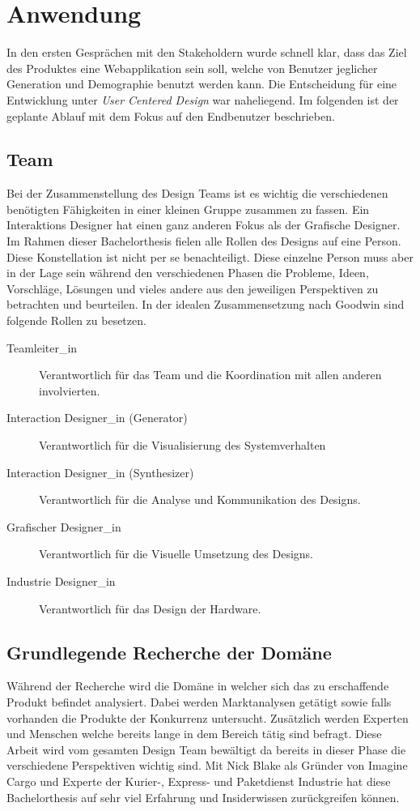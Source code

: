 \section{Anwendung}
In den ersten Gesprächen mit den Stakeholdern wurde schnell klar, dass das Ziel des Produktes eine Webapplikation sein soll, welche von Benutzer jeglicher Generation und Demographie benutzt werden kann. Die Entscheidung für eine Entwicklung unter \textit{User Centered Design} war naheliegend. Im folgenden ist der geplante Ablauf mit dem Fokus auf den Endbenutzer beschrieben.

\subsection{Team}
Bei der Zusammenstellung des Design Teams ist es wichtig die verschiedenen benötigten Fähigkeiten in einer kleinen Gruppe zusammen zu fassen. Ein Interaktions Designer hat einen ganz anderen Fokus als der Grafische Designer. Im Rahmen dieser Bachelorthesis fielen alle Rollen des Designs auf eine Person. Diese Konstellation ist nicht per se benachteiligt. Diese einzelne Person muss aber in der Lage sein während den verschiedenen Phasen die Probleme, Ideen, Vorschläge, Lösungen und vieles andere aus den jeweiligen Perspektiven zu betrachten und beurteilen. In der idealen Zusammensetzung nach Goodwin sind folgende Rollen zu besetzen\citep[Kapitel 2]{goodwin2011designing}.
\begin{description}
	\item [Teamleiter\_in] Verantwortlich für das Team und die Koordination mit allen anderen involvierten.
	\item [Interaction Designer\_in (Generator)] Verantwortlich für die Visualisierung des Systemverhalten
	\item [Interaction Designer\_in (Synthesizer)] Verantwortlich für die Analyse und Kommunikation des Designs.
	\item [Grafischer Designer\_in] Verantwortlich für die Visuelle Umsetzung des Designs.
	\item [Industrie Designer\_in] Verantwortlich für das Design der Hardware.
\end{description}

\subsection{Grundlegende Recherche der Domäne}
Während der Recherche wird die Domäne in welcher sich das zu erschaffende Produkt befindet analysiert. Dabei werden Marktanalysen getätigt sowie falls vorhanden die Produkte der Konkurrenz untersucht. Zusätzlich werden Experten und Menschen welche bereits lange in dem Bereich tätig sind befragt. Diese Arbeit wird vom gesamten Design Team bewältigt da bereits in dieser Phase die verschiedene Perspektiven wichtig sind. Mit Nick Blake als Gründer von Imagine Cargo und Experte der Kurier-, Express- und Paketdienst Industrie hat diese Bachelorthesis auf sehr viel Erfahrung und Insiderwissen zurückgreifen können.

